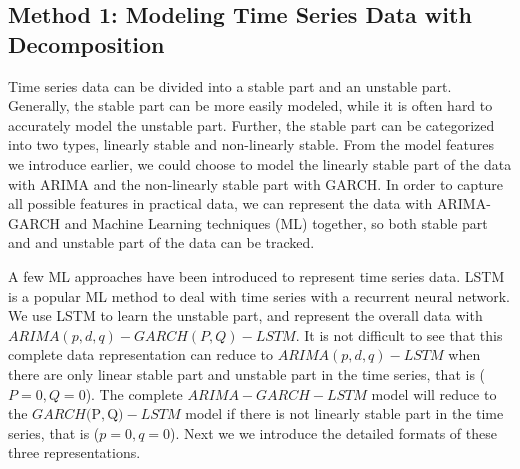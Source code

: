 \subsection{Method 1: Modeling Time Series Data with Decomposition}


Time series data can be divided into a stable part and an unstable part. Generally, the stable part can be more easily modeled, while it is often hard to  accurately model the unstable part. Further, the stable part can be categorized  into two types, linearly stable  and non-linearly stable. From the model features we introduce earlier, we could choose to model the linearly stable part of the data with ARIMA and the non-linearly stable part with GARCH. In order to capture all possible features in practical data, we can represent the data with  ARIMA-GARCH and Machine Learning techniques (ML) together, so both stable part and and unstable part of the data can be tracked. 

A few ML approaches have been introduced to represent time series data. 
LSTM is a  popular ML method to deal with time series with a recurrent neural network. We use  LSTM to learn the unstable part,
and represent the overall data with $ARIMA(p,d,q)-GARCH(P,Q)-LSTM$. It is not difficult to see that this complete data representation can reduce to $ARIMA(p,d,q)-LSTM$ when there are only linear stable part and unstable part in the time series, that is ($P=0,Q=0$). The complete $ARIMA-GARCH-LSTM$ model  will reduce to the $GARCH($P$,$Q$)-LSTM$ model if there is not linearly stable part in the time series, that is ($p=0,q=0$). Next we we introduce the detailed formats of these three representations. 


